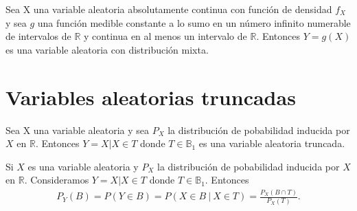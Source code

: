 \begin{prop}
    Sea X una variable aleatoria absolutamente continua con función de densidad $f_X$ y sea $g$ una función medible constante a lo sumo en un número infinito numerable de intervalos de $\mathbb{R}$ y continua en al menos un intervalo de $\mathbb{R}$. Entonces $Y = g(X)$ es una variable aleatoria con distribución mixta.
\end{prop}

\section{Variables aleatorias truncadas}

\begin{defi}
    Sea X una variable aleatoria y sea $P_X$ la distribución de pobabilidad inducida por $X$ en $\mathbb{R}$. Entonces $Y = X | X \in T$ donde $T \in \mathbb{B}_1$ es una variable aleatoria truncada.
\end{defi}

\begin{obs}
    Si $X$ es una variable aleatoria y $P_X$ la distribución de pobabilidad inducida por $X$ en $\mathbb{R}$. Consideramos $Y = X | X \in T$ donde $T \in \mathbb{B}_1$. Entonces
    \begin{align*}
        P_Y(B) = P(Y \in B) = P(X \in B \ | \ X \in T) = \frac{P_X(B \cap T)}{P_X(T)}.
    \end{align*}
\end{obs}

